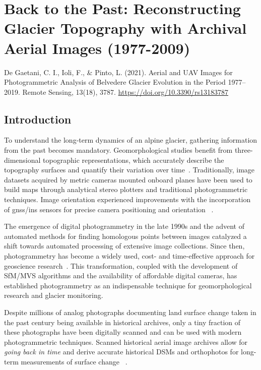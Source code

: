 \graphicspath{{figures/chapter2/}}
\onehalfspacing

\chapter{Back to the Past: Reconstructing Glacier Topography with Archival Aerial Images
  (1977-2009)}\label{ch:2}
  
\vfill


\noindent De Gaetani, C. I., Ioli, F., \& Pinto, L. (2021). Aerial and UAV Images for Photogrammetric Analysis of Belvedere Glacier Evolution in the Period 1977–2019. Remote Sensing, 13(18), 3787. \url{https://doi.org/10.3390/rs13183787}

\newpage

\section{Introduction}\label{sec:2:introduction}

To understand the long-term dynamics of an alpine glacier, gathering information from the past becomes mandatory. 
Geomorphological studies benefit from three-dimensional topographic representations, which accurately describe the topography surfaces and quantify their variation over time~\citep{chandler1995steady}.
Traditionally, image datasets acquired by metric cameras mounted onboard planes have been used to build maps through analytical stereo plotters and traditional photogrammetric techniques. 
Image orientation experienced improvements with the incorporation of \acs{gnss}/\acs{ins} sensors for precise camera positioning and orientation
~\citep{Forlani_pinto2001, jacobsen2004issues}.

The emergence of digital photogrammetry in the late 1990s and the advent of automated methods for finding homologous points between images catalyzed a shift towards automated processing of extensive image collections. 
Since then, photogrammetry has become a widely used, cost- and time-effective approach for geoscience research~\citep{Lane2000}.
This transformation, coupled with the development of SfM/MVS algorithms and the availability of affordable digital cameras, has established photogrammetry as an indispensable technique for geomorphological research and glacier monitoring.

Despite millions of analog photographs documenting land surface change taken in the past century being available in historical archives, only a tiny fraction of these photographs have been digitally scanned and can be used with modern photogrammetric techniques. 
Scanned historical aerial image archives allow for \textit{going back in time} and derive accurate historical DSMs and orthophotos for long-term measurements of surface change ~\citep{Micheletti2015}.

